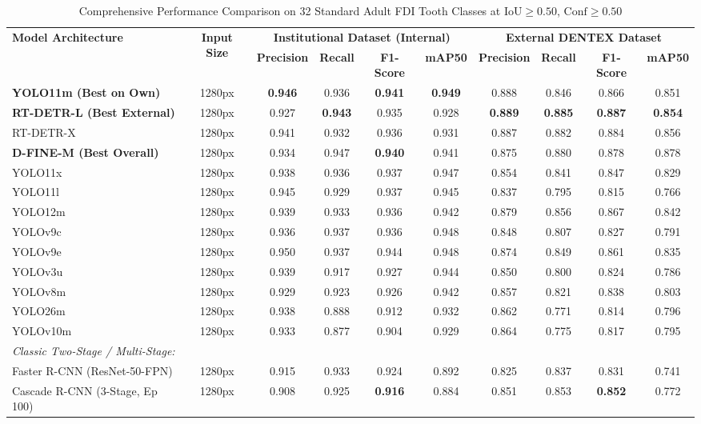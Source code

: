 \documentclass[10pt,journal,compsoc]{IEEEtran}
\begin{document}
\begin{table}[t]
\centering
\caption{Comprehensive Performance Comparison on 32 Standard Adult FDI Tooth Classes at $\text{IoU} \ge 0.50$, $\text{Conf} \ge 0.50$}
\label{tab:master_benchmark}
\begin{tabular}{l c c c c c c c c c}
\toprule
\multirow{2}{*}{\textbf{Model Architecture}} & \multirow{2}{*}{\textbf{Input Size}} & \multicolumn{4}{c}{\textbf{Institutional Dataset (Internal)}} & \multicolumn{4}{c}{\textbf{External DENTEX Dataset}} \\
\cmidrule(lr){3-6} \cmidrule(lr){7-10}
& & \textbf{Precision} & \textbf{Recall} & \textbf{F1-Score} & \textbf{mAP50} & \textbf{Precision} & \textbf{Recall} & \textbf{F1-Score} & \textbf{mAP50} \\
\midrule
\textbf{YOLO11m (Best on Own)} & 1280px & \textbf{0.946} & 0.936 & \textbf{0.941} & \textbf{0.949} & 0.888 & 0.846 & 0.866 & 0.851 \\
\textbf{RT-DETR-L (Best External)} & 1280px & 0.927 & \textbf{0.943} & 0.935 & 0.928 & \textbf{0.889} & \textbf{0.885} & \textbf{0.887} & \textbf{0.854} \\
RT-DETR-X & 1280px & 0.941 & 0.932 & 0.936 & 0.931 & 0.887 & 0.882 & 0.884 & 0.856 \\
\textbf{D-FINE-M (Best Overall)} & 1280px & 0.934 & 0.947 & \textbf{0.940} & 0.941 & 0.875 & 0.880 & 0.878 & 0.878 \\
YOLO11x & 1280px & 0.938 & 0.936 & 0.937 & 0.947 & 0.854 & 0.841 & 0.847 & 0.829 \\
YOLO11l & 1280px & 0.945 & 0.929 & 0.937 & 0.945 & 0.837 & 0.795 & 0.815 & 0.766 \\
YOLO12m & 1280px & 0.939 & 0.933 & 0.936 & 0.942 & 0.879 & 0.856 & 0.867 & 0.842 \\
YOLOv9c & 1280px & 0.936 & 0.937 & 0.936 & 0.948 & 0.848 & 0.807 & 0.827 & 0.791 \\
YOLOv9e & 1280px & 0.950 & 0.937 & 0.944 & 0.948 & 0.874 & 0.849 & 0.861 & 0.835 \\
YOLOv3u & 1280px & 0.939 & 0.917 & 0.927 & 0.944 & 0.850 & 0.800 & 0.824 & 0.786 \\
YOLOv8m & 1280px & 0.929 & 0.923 & 0.926 & 0.942 & 0.857 & 0.821 & 0.838 & 0.803 \\
YOLO26m & 1280px & 0.938 & 0.888 & 0.912 & 0.932 & 0.862 & 0.771 & 0.814 & 0.796 \\
YOLOv10m & 1280px & 0.933 & 0.877 & 0.904 & 0.929 & 0.864 & 0.775 & 0.817 & 0.795 \\
\midrule
\textit{Classic Two-Stage / Multi-Stage:} & & & & & & & & & \\
Faster R-CNN (ResNet-50-FPN) & 1280px & 0.915 & 0.933 & 0.924 & 0.892 & 0.825 & 0.837 & 0.831 & 0.741 \\
Cascade R-CNN (3-Stage, Ep 100) & 1280px & 0.908 & 0.925 & \textbf{0.916} & 0.884 & 0.851 & 0.853 & \textbf{0.852} & 0.772 \\
\bottomrule
\end{tabular}
\end{table}
\end{document}
